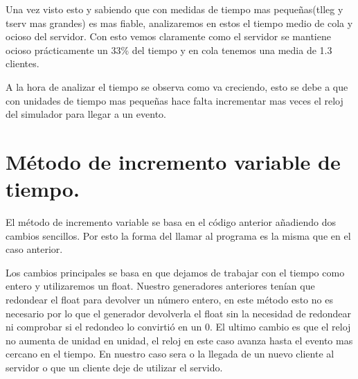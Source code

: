 \documentclass[]{article}
\begin{document}
Una vez visto esto y sabiendo que con medidas de tiempo mas pequeñas(tlleg y tserv mas grandes) es mas fiable, analizaremos en estos el tiempo medio de cola y ocioso del servidor. Con esto vemos claramente como el servidor se mantiene ocioso prácticamente un 33\% del tiempo y en cola tenemos una media de 1.3 clientes.
\newline

A la hora de analizar el tiempo se observa como va creciendo, esto se debe a que con unidades de tiempo mas pequeñas hace falta incrementar mas veces el reloj del simulador para llegar a un evento. 
\newpage
\section{Método de incremento variable de tiempo.}
El método de incremento variable se basa en el código anterior añadiendo dos cambios sencillos. Por esto la forma del llamar al programa es la misma que en el caso anterior.
\newline

Los cambios principales se basa en que dejamos de trabajar con el tiempo como entero y utilizaremos un float. Nuestro generadores anteriores tenían que redondear el float para devolver un número entero, en este método esto no es necesario por lo que el generador devolverla el float sin la necesidad de redondear ni comprobar si el redondeo lo convirtió en un 0. El ultimo cambio es que el reloj no aumenta de unidad en unidad, el reloj en este caso avanza hasta el evento mas cercano en el tiempo. En nuestro caso sera o la llegada de un nuevo cliente al servidor o que un cliente deje de utilizar el servido. 
\newline
\end{document}
